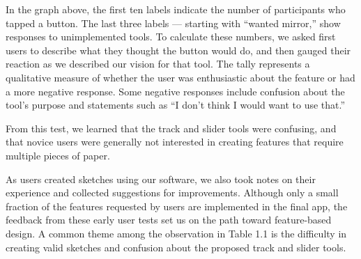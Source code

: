In the graph above, the first ten labels indicate the number of
participants who tapped a button. The last three labels --- starting
with ``wanted mirror,'' show responses to unimplemented tools. To
calculate these numbers, we asked first users to describe what they
thought the button would do, and then gauged their reaction as we
described our vision for that tool. The tally represents a qualitative
measure of whether the user was enthusiastic about the feature or had a
more negative response. Some negative responses include confusion about
the tool's purpose and statements such as ``I don't think I would want
to use that.''

From this test, we learned that the track and slider tools were
confusing, and that novice users were generally not interested in
creating features that require multiple pieces of paper.

As users created sketches using our software, we also took notes on
their experience and collected suggestions for improvements. Although
only a small fraction of the features requested by users are implemented
in the final app, the feedback from these early user tests set us on the
path toward feature-based design. A common theme among the observation
in Table 1.1 is the difficulty in creating valid sketches and confusion
about the proposed track and slider tools.

